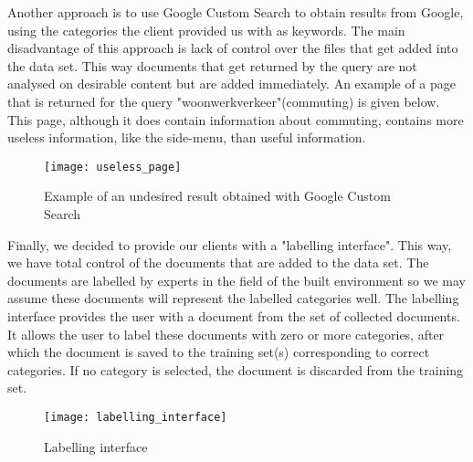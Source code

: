 Another approach is to use Google Custom Search to obtain results from Google, using the categories the client provided us with as keywords. The main disadvantage of this approach is lack of control over the files that get added into the data set. This way documents that get returned by the query are not analysed on desirable content but are added immediately. An example of a page that is returned for the query "woonwerkverkeer"(commuting) is given below. This page, although it does contain information about commuting, contains more useless information, like the side-menu, than useful information.\\

\begin{figure}[h]
\centering
\texttt{[image: useless\_page]}
\caption{Example of an undesired result obtained with Google Custom Search}
\label{fig:useless_page}
\end{figure}

Finally, we decided to provide our clients with a "labelling interface". This way, we have total control of the documents that are added to the data set. The documents are labelled by experts in the field of the built environment so we may assume these documents will represent the labelled categories well. The labelling interface provides the user with a document from the set of collected documents. It allows the user to label these documents with zero or more categories, after which the document is saved to the training set(s) corresponding to correct categories. If no category is selected, the document is discarded from the training set. 

\begin{figure}[h]
\centering
\texttt{[image: labelling\_interface]}
\caption{Labelling interface}
\label{fig:labelling_interface}
\end{figure}

